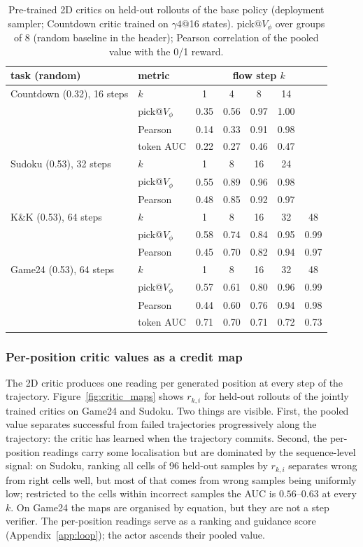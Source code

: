 \begin{table}[H]\centering\small
\caption{Pre-trained 2D critics on held-out rollouts of the base policy (deployment sampler; Countdown critic trained on $\gamma4$@16 states). pick@$V_\phi$ over groups of 8 (random baseline in the header); Pearson correlation of the pooled value with the 0/1 reward.}\label{tab:critic_quality}
\begin{tabular}{@{}llccccc@{}}\toprule
task (random) & metric & \multicolumn{5}{c}{flow step $k$}\\\midrule
Countdown (0.32), 16 steps & $k$ & 1 & 4 & 8 & 14 & \\
& pick@$V_\phi$ & 0.35 & 0.56 & 0.97 & 1.00 & \\
& Pearson & 0.14 & 0.33 & 0.91 & 0.98 & \\
& token AUC & 0.22 & 0.27 & 0.46 & 0.47 & \\\midrule
Sudoku (0.53), 32 steps & $k$ & 1 & 8 & 16 & 24 & \\
& pick@$V_\phi$ & 0.55 & 0.89 & 0.96 & 0.98 & \\
& Pearson & 0.48 & 0.85 & 0.92 & 0.97 & \\\midrule
K\&K (0.53), 64 steps & $k$ & 1 & 8 & 16 & 32 & 48\\
& pick@$V_\phi$ & 0.58 & 0.74 & 0.84 & 0.95 & 0.99\\
& Pearson & 0.45 & 0.70 & 0.82 & 0.94 & 0.97\\\midrule
Game24 (0.53), 64 steps & $k$ & 1 & 8 & 16 & 32 & 48\\
& pick@$V_\phi$ & 0.57 & 0.61 & 0.80 & 0.96 & 0.99\\
& Pearson & 0.44 & 0.60 & 0.76 & 0.94 & 0.98\\
& token AUC & 0.71 & 0.70 & 0.71 & 0.72 & 0.73\\\bottomrule\end{tabular}\end{table}

\subsubsection{Per-position critic values as a credit map}
\label{app:critic_maps}
The 2D critic produces one reading per generated position at every step of the trajectory. Figure~\ref{fig:critic_maps} shows $r_{k,i}$ for held-out rollouts of the jointly trained critics on Game24 and Sudoku. Two things are visible. First, the pooled value separates successful from failed trajectories progressively along the trajectory: the critic has learned when the trajectory commits. Second, the per-position readings carry some localisation but are dominated by the sequence-level signal: on Sudoku, ranking all cells of 96 held-out samples by $r_{k,i}$ separates wrong from right cells well, but most of that comes from wrong samples being uniformly low; restricted to the cells within incorrect samples the AUC is $0.56$--$0.63$ at every $k$. On Game24 the maps are organised by equation, but they are not a step verifier. The per-position readings serve as a ranking and guidance score (Appendix~\ref{app:loop}); the actor ascends their pooled value.

